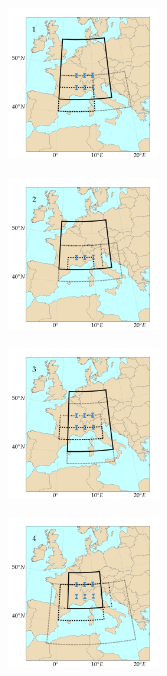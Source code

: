 \documentclass[twocol]{ametsoc}
\begin{document}
\begin{figure}[htb]
	\centering
	\begin{subfigure}{.5\columnwidth}
		\centering
		\includegraphics[width=4cm]{figures/spatial_win_z4-hi2/Spatial_windows_1.png}
	\end{subfigure}%
	\begin{subfigure}{.5\columnwidth}
		\centering
		\includegraphics[width=4cm]{figures/spatial_win_z4-hi2/Spatial_windows_2.png}
	\end{subfigure}
	\begin{subfigure}{.5\columnwidth}
		\centering
		\includegraphics[width=4cm]{figures/spatial_win_z4-hi2/Spatial_windows_3.png}
	\end{subfigure}%
	\begin{subfigure}{.5\columnwidth}
		\centering
		\includegraphics[width=4cm]{figures/spatial_win_z4-hi2/Spatial_windows_4.png}

\end{subfigure}
\end{figure}
\end{document}
